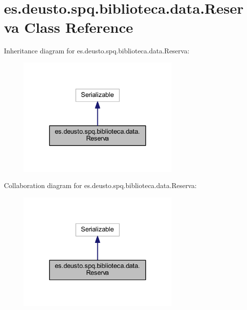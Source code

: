 \hypertarget{classes_1_1deusto_1_1spq_1_1biblioteca_1_1data_1_1_reserva}{}\section{es.\+deusto.\+spq.\+biblioteca.\+data.\+Reserva Class Reference}
\label{classes_1_1deusto_1_1spq_1_1biblioteca_1_1data_1_1_reserva}


Inheritance diagram for es.\+deusto.\+spq.\+biblioteca.\+data.\+Reserva\+:
\nopagebreak
\begin{figure}[H]
\begin{center}
\leavevmode
\includegraphics[width=227pt]{classes_1_1deusto_1_1spq_1_1biblioteca_1_1data_1_1_reserva__inherit__graph}
\end{center}
\end{figure}


Collaboration diagram for es.\+deusto.\+spq.\+biblioteca.\+data.\+Reserva\+:
\nopagebreak
\begin{figure}[H]
\begin{center}
\leavevmode
\includegraphics[width=227pt]{classes_1_1deusto_1_1spq_1_1biblioteca_1_1data_1_1_reserva__coll__graph}
\end{center}
\end{figure}
